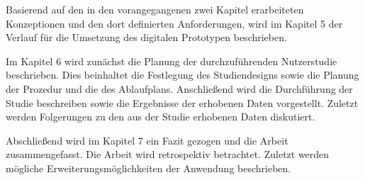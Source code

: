 Basierend auf den in den vorangegangenen zwei Kapitel erarbeiteten Konzeptionen und den dort definierten Anforderungen, wird im Kapitel 5 der Verlauf für die 
Umsetzung des digitalen Prototypen beschrieben.      

Im Kapitel 6 wird zunächst die Planung der durchzuführenden Nutzerstudie beschrieben. Dies beinhaltet die Festlegung des Studiendesigns sowie die Planung der Prozedur und die des Ablaufplans. 
Anschließend wird die Durchführung der Studie beschreiben sowie die Ergebnisse der erhobenen Daten vorgestellt. Zuletzt werden Folgerungen zu den aus der Studie erhobenen Daten diskutiert.

Abschließend wird im Kapitel 7 ein Fazit gezogen und die Arbeit zusammengefasst. Die Arbeit wird retrospektiv betrachtet. 
Zuletzt werden mögliche Erweiterungsmöglichkeiten der Anwendung beschrieben. 